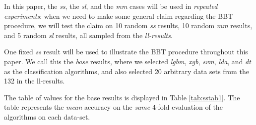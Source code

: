 \documentclass[twoside,11pt,preprint]{article}
\begin{document}
In this paper, the \emph{ss}, the \emph{sl}, and the \emph{mm} cases will be used in \emph{repeated experiments}: when we need to make some general claim regarding the BBT procedure, we will test the claim on 10 random \emph{ss} results, 10 random \emph{mm} results, and 5 random \emph{sl} results, all sampled from the \emph{ll-results}.

One fixed \emph{ss} result will be used to illustrate the BBT procedure
throughout this paper. We call this the \emph{base} results, where we
selected \emph{lgbm}, \emph{xgb}, \emph{svm}, \emph{lda}, and \emph{dt} as the classification
algorithms, and also selected 20 arbitrary data sets from the 132 in
the ll-results.

The table of values for the base results is displayed in Table \ref{tab:sstab1}.
The table represents the \emph{mean} accuracy on the \emph{same} 4-fold evaluation of the algorithms on each data-set.
\end{document}
